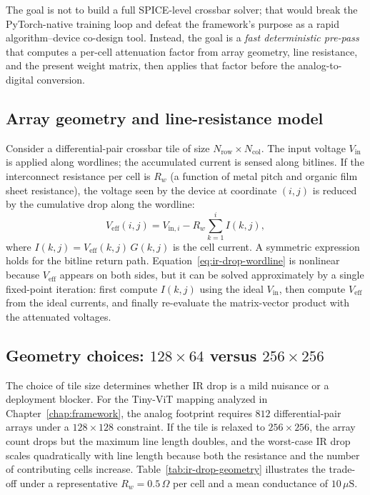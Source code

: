 The goal is not to build a full SPICE-level crossbar solver; that would break the PyTorch-native training loop and defeat the framework's purpose as a rapid algorithm--device co-design tool.  Instead, the goal is a \emph{fast deterministic pre-pass} that computes a per-cell attenuation factor from array geometry, line resistance, and the present weight matrix, then applies that factor before the analog-to-digital conversion.

\subsection{Array geometry and line-resistance model}

Consider a differential-pair crossbar tile of size $N_{\text{row}} \times N_{\text{col}}$.  The input voltage $V_{\text{in}}$ is applied along wordlines; the accumulated current is sensed along bitlines.  If the interconnect resistance per cell is $R_{w}$ (a function of metal pitch and organic film sheet resistance), the voltage seen by the device at coordinate $(i,j)$ is reduced by the cumulative drop along the wordline:
\begin{equation}
    V_{\text{eff}}(i,j) = V_{\text{in},i} - R_{w} \sum_{k=1}^{i} I(k,j),
    \label{eq:ir-drop-wordline}
\end{equation}
where $I(k,j) = V_{\text{eff}}(k,j) \, G(k,j)$ is the cell current.  A symmetric expression holds for the bitline return path.  Equation~\ref{eq:ir-drop-wordline} is nonlinear because $V_{\text{eff}}$ appears on both sides, but it can be solved approximately by a single fixed-point iteration: first compute $I(k,j)$ using the ideal $V_{\text{in}}$, then compute $V_{\text{eff}}$ from the ideal currents, and finally re-evaluate the matrix-vector product with the attenuated voltages.

\subsection{Geometry choices: $128 \times 64$ versus $256 \times 256$}

The choice of tile size determines whether IR drop is a mild nuisance or a deployment blocker.  For the Tiny-ViT mapping analyzed in Chapter~\ref{chap:framework}, the analog footprint requires $812$ differential-pair arrays under a $128 \times 128$ constraint.  If the tile is relaxed to $256 \times 256$, the array count drops but the maximum line length doubles, and the worst-case IR drop scales quadratically with line length because both the resistance and the number of contributing cells increase.  Table~\ref{tab:ir-drop-geometry} illustrates the trade-off under a representative $R_{w} = 0.5\,\Omega$ per cell and a mean conductance of $10\,\mu\mathrm{S}$.

